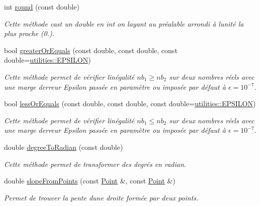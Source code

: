 \begin{DoxyCompactItemize}
int \hyperlink{namespaceutilities_a00ae09dc5ce4274969a2a28607426eb5}{round} (const double)
\begin{DoxyCompactList}\small\item\em Cette méthode cast un double en int on l\textquotesingle{}ayant au préalable arrondi à l\textquotesingle{}unité la plus proche (0.). \end{DoxyCompactList}\item 
bool \hyperlink{namespaceutilities_a4001cf523b54a14a53b11938a2605964}{greater\+Or\+Equals} (const double, const double, const double=\hyperlink{namespaceutilities_adf3b0db93e9d9a6057599d3629607c72}{utilities\+::\+E\+P\+S\+I\+L\+O\+N})
\begin{DoxyCompactList}\small\item\em Cette méthode permet de vérifier l\textquotesingle{}inégalité $ nb_1 \geq nb_2 $ sur deux nombres réels avec une marge d\textquotesingle{}erreur Epsilon passée en paramètre ou imposée par défaut à $ \epsilon = 10^{-7}$. \end{DoxyCompactList}\item 
bool \hyperlink{namespaceutilities_a5b52313a89eff9ec934ab4e1fcf23be7}{less\+Or\+Equals} (const double, const double, const double=\hyperlink{namespaceutilities_adf3b0db93e9d9a6057599d3629607c72}{utilities\+::\+E\+P\+S\+I\+L\+O\+N})
\begin{DoxyCompactList}\small\item\em Cette méthode permet de vérifier l\textquotesingle{}inégalité $ nb_1 \leq nb_2 $ sur deux nombres réels avec une marge d\textquotesingle{}erreur Epsilon passée en paramètre ou imposée par défaut à $ \epsilon = 10^{-7}$. \end{DoxyCompactList}\item 
double \hyperlink{namespaceutilities_a6502e590807ff5ce206bf28b156c2d9e}{degree\+To\+Radian} (const double)
\begin{DoxyCompactList}\small\item\em Cette méthode permet de transformer des degrés en radian. \end{DoxyCompactList}\item 
double \hyperlink{namespaceutilities_a8ec19db42cc8962662eee53be6c6088d}{slope\+From\+Points} (const \hyperlink{classPoint}{Point} \&, const \hyperlink{classPoint}{Point} \&)
\begin{DoxyCompactList}\small\item\em Permet de trouver la pente d\textquotesingle{}une droite formée par deux points. \end{DoxyCompactList}\item 

\end{DoxyCompactItemize}
